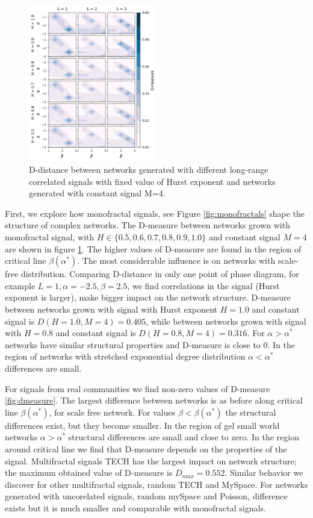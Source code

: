 \begin{figure}[h!]
	\centering
	\includegraphics[width=0.5\textwidth]{Figures/Ddist_M4_w10.5_w20.5.png}
	\caption{D-distance between networks generated with different long-range correlated signals with fixed value of Hurst exponent and networks generated with constant signal M=4.}
	\label{fig:Ddist_m}
\end{figure}

First, we explore how monofractal signals, see Figure \ref{fig:monofractals} shape the structure of complex networks. The D-measure between networks grown with monofractal signal, with $H \in \{0.5, 0.6, 0.7, 0.8, 0.9, 1.0\}$ and constant signal $M=4$ are shown in figure \ref{fig:Ddist_m}. The higher values of D-measure are found in the region of critical line $\beta(\alpha^{*})$. The most considerable influence is on networks with scale-free distribution. Comparing D-distance in only one point of  phase diagram, for example $L=1, \alpha = -2.5, \beta = 2.5$, we find correlations in the signal (Hurst exponent is larger), make bigger impact on the network structure. D-measure between networks grown with signal with Hurst exponent $H=1.0$ and constant signal is $D(H=1.0, M=4) = 0.405$, while between networks grown with signal with $H=0.8$ and constant signal is $D(H=0.8, M=4) = 0.316$. For $\alpha>\alpha^{*}$ networks have similar structural properties and D-measure is close to 0. In the region of networks with stretched exponential degree distribution $\alpha<\alpha^{*}$  differences are small.  

For signals from real communities we find non-zero values of D-measure \ref{fig:dmeasure}. The largest difference between networks is as before along critical line $\beta(\alpha^{*})$, for scale free network. For values $\beta<\beta(\alpha^{*})$ the structural differences exist, but they become smaller. In the region of gel small world networks $\alpha>\alpha^{*}$ structural differences are small and close to zero. In the region around critical line we find that D-measure depends on the properties of the signal. Multifractal signals TECH has the largest impact on network structure; the maximum obtained value of D-measure is $D_{max}=0.552$. Similar behavior we discover for other multifractal signals, random TECH and MySpace. For networks generated with uncorelated signals, random mySpace and Poisson, difference exists but it is much smaller and comparable with monofractal signals.  


